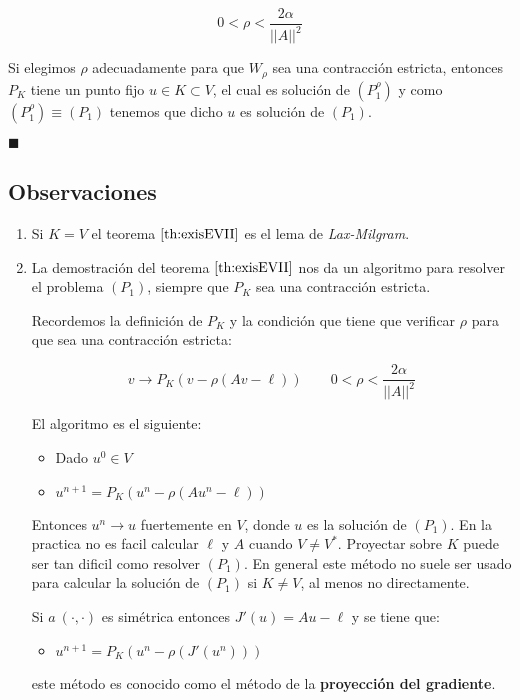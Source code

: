 \begin{demosteorema}
\begin{itemize}
\begin{displaymath}
0 < \rho < \frac{2\alpha}{||A||^2}
\end{displaymath}

Si elegimos $\rho$ adecuadamente para que $W_{\rho}$ sea una contracci\'on
estricta, entonces $P_K$ tiene un punto fijo $u \in K \subset V$, el cual es
soluci\'on de $(P_1^{\rho})$ y como $(P_1^{\rho}) \equiv (P_1)$ tenemos que
dicho $u$ es soluci\'on de $(P_1)$.

\end{itemize}

\begin{flushright}
$\blacksquare$
\end{flushright}

\end{demosteorema}

\subsection{Observaciones}

\begin{enumerate}
\item Si $K=V$ el teorema $\ref{th:exisEVII}$ es el lema de \emph{Lax-Milgram}.
\item La demostraci\'on del teorema $\ref{th:exisEVII}$ nos da un algoritmo para
resolver el problema $(P_1)$, siempre que $P_K$ sea una contracci\'on
estricta.\newline

Recordemos la definici\'on de $P_K$ y la condici\'on que tiene que verificar
$\rho$ para que sea una contracci\'on estricta:

\begin{displaymath}
v \to P_K(v-\rho(Av - \ell) ) \qquad 0<\rho < \frac{2 \alpha}{||A||^2}
\end{displaymath}
\newpage

El algoritmo es el siguiente:

\begin{itemize}
\item Dado $u^0 \in V$
\item $u^{n+1} = P_K(u^n-\rho (Au^n -\ell))$
\end{itemize}

Entonces $u^n \longrightarrow u$ fuertemente en $V$, donde $u$ es la soluci\'on
de $(P_1)$. En la practica no es facil calcular $\ell$ y $A$ cuando
$V \neq V^{*}$. Proyectar sobre $K$ puede ser tan dificil como resolver
$(P_1)$. En general este m\'etodo no suele ser usado para calcular la soluci\'on
de $(P_1)$ si $K \neq V$, al menos no directamente.\newline

Si $a\ (\cdot, \cdot)$ es sim\'etrica entonces $J'(u) = Au - \ell$ y se tiene
que:

\begin{itemize}
\item $u^{n+1} = P_K(u^n-\rho (J'(u^n)))$
\end{itemize}

este m\'etodo es conocido como el m\'etodo de la \textbf{proyecci\'on del
gradiente}.
\end{enumerate}

